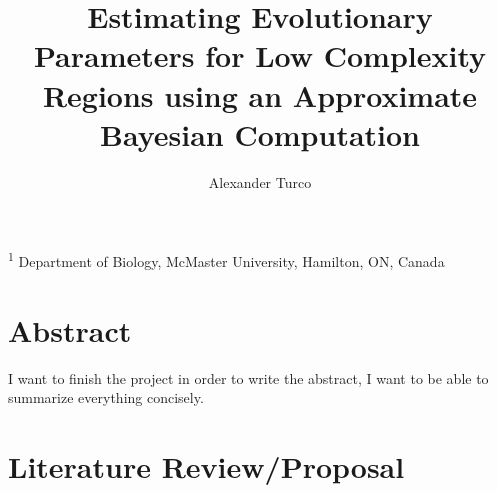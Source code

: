 \documentclass{article}
\title{\sc Estimating Evolutionary Parameters for Low Complexity Regions using an Approximate Bayesian Computation}
\author{\sc Alexander Turco}
\begin{document}

\onecolumn
                        \maketitle

\thispagestyle{empty}
\noindent \textsuperscript{1} Department of Biology, McMaster University, Hamilton, ON, Canada

\newpage
\tableofcontents
\newpage
       
\section{Abstract} 

I want to finish the project in order to write the abstract, I want to be able to summarize everything concisely.

\bigskip
                        
                        
                        
\newpage
%

\section{Literature Review/Proposal}
\end{document}
